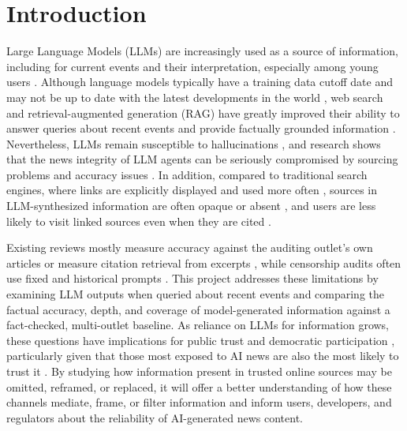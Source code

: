 \section{Introduction}\label{sec:intro}
 
Large Language Models (LLMs) are increasingly used as a source of information, including for current events and their interpretation, especially among young users \citep{reuters2026dnr, niemanlab2026chatbots}. Although language models typically have a training data cutoff date and may not be up to date with the latest developments in the world \citep{vu2024freshllms}, web search and retrieval-augmented generation (RAG) have greatly improved their ability to answer queries about recent events and provide factually grounded information \citep{lewis2020rag}. Nevertheless, LLMs remain susceptible to hallucinations \citep{huang2025hallucination}, and research shows that the news integrity of LLM agents can be seriously compromised by sourcing problems and accuracy issues \citep{ebu2025newsintegrity, jazwinska2025citation}. In addition, compared to traditional search engines, where links are explicitly displayed and used more often \citep{reuters2026chatbots}, sources in LLM-synthesized information are often opaque or absent \citep{liu2023verifiability}, and users are less likely to visit linked sources even when they are cited \citep{chapekis2025pew}.

Existing reviews mostly measure accuracy against the auditing outlet's own articles \citep{ebu2025newsintegrity, bbc2025representation} or measure citation retrieval from excerpts \citep{jazwinska2025citation}, while censorship audits often use fixed and historical prompts \citep{naseh2025r1dacted, pan2026censorship}. This project addresses these limitations by examining LLM outputs when queried about recent events and comparing the factual accuracy, depth, and coverage of model-generated information against a fact-checked, multi-outlet baseline. As reliance on LLMs for information grows, these questions have implications for public trust and democratic participation \citep{ebu2025newsintegrity}, particularly given that those most exposed to AI news are also the most likely to trust it \citep{niemanlab2026chatbots}. By studying how information present in trusted online sources may be omitted, reframed, or replaced, it will offer a better understanding of how these channels mediate, frame, or filter information and inform users, developers, and regulators about the reliability of AI-generated news content.

